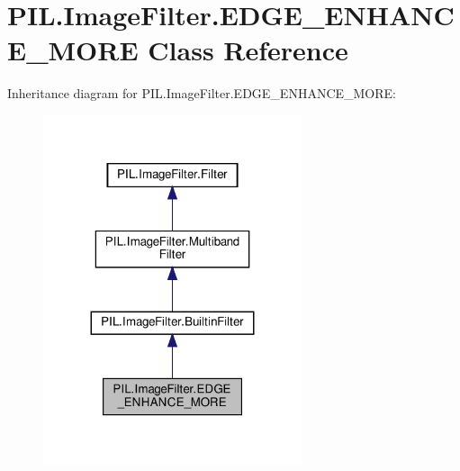 \hypertarget{classPIL_1_1ImageFilter_1_1EDGE__ENHANCE__MORE}{}\section{P\+I\+L.\+Image\+Filter.\+E\+D\+G\+E\+\_\+\+E\+N\+H\+A\+N\+C\+E\+\_\+\+M\+O\+RE Class Reference}
\label{classPIL_1_1ImageFilter_1_1EDGE__ENHANCE__MORE}


Inheritance diagram for P\+I\+L.\+Image\+Filter.\+E\+D\+G\+E\+\_\+\+E\+N\+H\+A\+N\+C\+E\+\_\+\+M\+O\+RE\+:
\nopagebreak
\begin{figure}[H]
\begin{center}
\leavevmode
\includegraphics[width=215pt]{classPIL_1_1ImageFilter_1_1EDGE__ENHANCE__MORE__inherit__graph}
\end{center}
\end{figure}


